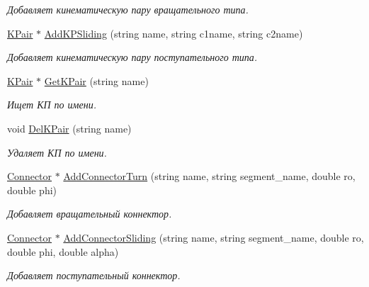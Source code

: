 \begin{DoxyCompactItemize}
\begin{DoxyCompactList}\small\item\em Добавляет кинематическую пару вращательного типа. \item\end{DoxyCompactList}\item 
\hyperlink{class_k_pair}{KPair} $\ast$ \hyperlink{class_comp_manager_a4686577f86845ea8df4f3b2682782fac}{AddKPSliding} (string name, string c1name, string c2name)
\begin{DoxyCompactList}\small\item\em Добавляет кинематическую пару поступательного типа. \item\end{DoxyCompactList}\item 
\hyperlink{class_k_pair}{KPair} $\ast$ \hyperlink{class_comp_manager_a339db4176aa621f6ee5571ac0b26635a}{GetKPair} (string name)
\begin{DoxyCompactList}\small\item\em Ищет КП по имени. \item\end{DoxyCompactList}\item 
void \hyperlink{class_comp_manager_acf9a726c050661051e19eca9b6a7d51d}{DelKPair} (string name)
\begin{DoxyCompactList}\small\item\em Удаляет КП по имени. \item\end{DoxyCompactList}\item 
\hyperlink{struct_connector}{Connector} $\ast$ \hyperlink{class_comp_manager_a11f96f8ae164686d883b92605e3601d5}{AddConnectorTurn} (string name, string segment\_\-name, double ro, double phi)
\begin{DoxyCompactList}\small\item\em Добавляет вращательный коннектор. \item\end{DoxyCompactList}\item 
\hyperlink{struct_connector}{Connector} $\ast$ \hyperlink{class_comp_manager_a1cf12ded84bf7d17ebbd4c042971133a}{AddConnectorSliding} (string name, string segment\_\-name, double ro, double phi, double alpha)
\begin{DoxyCompactList}\small\item\em Добавляет поступательный коннектор. \item\end{DoxyCompactList}\item 

\end{DoxyCompactItemize}
